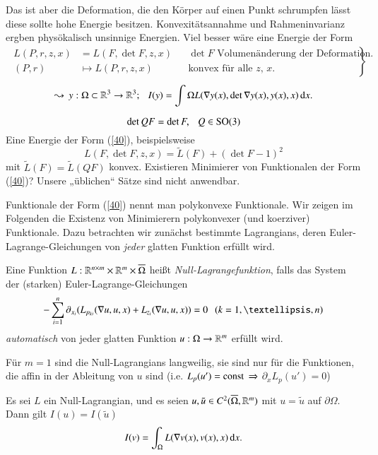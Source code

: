 Das ist aber die Deformation, die den Körper auf einen Punkt schrumpfen lässt diese sollte hohe Energie
besitzen. Konvexitätsannahme und Rahmeninvarianz ergben physökalisch unsinnige Energien. Viel besser wäre
eine Energie der Form
\begin{align}\label{40}
\left.\begin{array}{rlcl}
    L(P,r,z,x)&=L(F,\det F, z ,x)&&\text{$\det F$ Volumenänderung der Deformation.}\\
    (P,r)&\mapsto L(P,r,z,x) &&\text{konvex für alle $z$, $x$.}
\end{array}
\right\}
\end{align}
\[
    \leadsto \, y:\Omega\subset\mathbb{R}^3\rightarrow \mathbb{R}^3 ; \hspace{.25cm} I(y)=\int\Omega L(\nabla y(x),\det \nabla y(x),y(x),x)
    \, \mathrm{d} x.
\]
\begin{remark}
    \[
        \det QF = \det F, \hspace{.25cm} Q\in \mathrm{SO}(3)
    \]
    Eine Energie der Form (\ref{40}), beispielsweise
    \[
        L(F,\det F, z ,x) = \tilde L(F) + (\det F -1)^2
    \]
    mit $\tilde L(F)=\tilde L(QF)$ konvex.
    Existieren Minimierer von Funktionalen der Form (\ref{40})? Unsere „üblichen“ Sätze sind nicht
    anwendbar.
\end{remark}

Funktionale der Form (\ref{40}) nennt man polykonvexe Funktionale. Wir zeigen im Folgenden die Existenz
von Minimierern polykonvexer (und koerziver) Funktionale. Dazu betrachten wir zunächst bestimmte
Lagrangians, deren Euler-Lagrange-Gleichungen von \textit{jeder} glatten Funktion erfüllt wird.

\begin{defi}\label{5.5}
    Eine Funktion $L:\mathbb{R}^{n\times m} \times \mathbb{R}^m\times \overline \Omega$ heißt \textit{Null-Lagrangefunktion},
    falls das System der (starken) Euler-Lagrange-Gleichungen
    \[
        -\sum_{i=1}^n \partial_{x_i} (L_{p_{ki}}(\nabla u , u , x) + L_{z_i}(\nabla u , u, x) ) = 0 
        \qq (k=1,…,n)
    \]
    \textit{automatisch} von jeder glatten Funktion $u:\Omega\rightarrow \mathbb{R}^m$ erfüllt wird.
\end{defi}

\begin{remark}
    Für $m=1$ sind die Null-Lagrangians langweilig, sie sind nur für die Funktionen, die affin in
    der Ableitung von $u$ sind (i.e. $L_p(u')=\mathrm{const}$ $\Rightarrow$ $\partial_xL_p(u')=0$)
\end{remark}

\begin{theorem}\label{5.6}
    Es sei $L$ ein Null-Lagrangian, und es seien $u,\tilde u\in C^2(\overline \Omega,\mathbb{R}^m)$ mit $u=\tilde u$
    auf $\partial \Omega$. Dann gilt $I(u)=I(\tilde u)$
    \[
        I(v)=\int_\Omega L(\nabla v(x),v(x), x )\, \mathrm{d} x.
    \]
\end{theorem}

